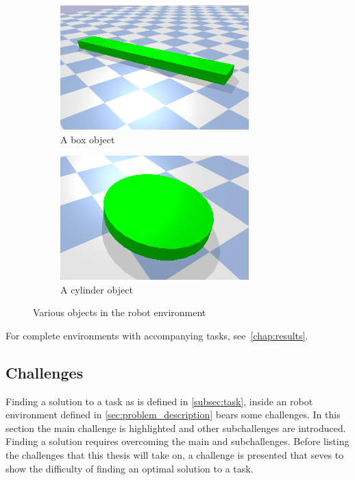 \begin{figure}[H]
    \centering
    \begin{subfigure}{.5\textwidth}
    \centering
    \includegraphics[width=0.8\textwidth]{figures/box_object.png}
    \caption{A box object}
    \end{subfigure}%
    \begin{subfigure}{.5\textwidth}
    \centering
    \includegraphics[width=0.8\textwidth]{figures/cylinder_object.png}
    \caption{A cylinder object}
    \end{subfigure}%
    \caption{Various objects in the robot environment}%
    \label{fig:example_objects}
\end{figure}

For complete environments with accompanying tasks, see~\cref{chap:results}.\bs

\subsection{Challenges}%
\label{subsection:problems_with_task_planning}
Finding a solution to a task as is defined in \cref{subsec:task}, inside an robot environment defined in \cref{sec:problem_description} bears some challenges. In this section the main challenge is highlighted and other subchallenges are introduced. Finding a solution requires overcoming the main and subchallenges. Before listing the challenges that this thesis will take on, a challenge is presented that seves to show the difficulty of finding an optimal solution to a task.\bs

